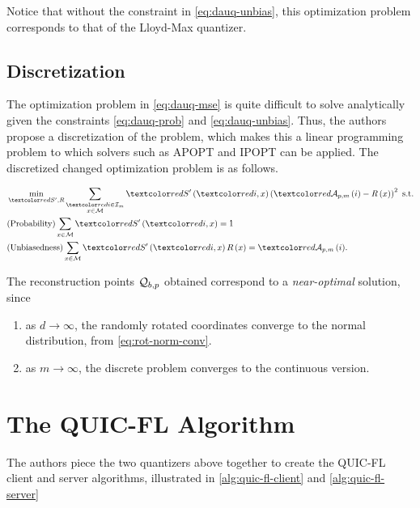 \documentclass[journal,12pt,twocolumn]{IEEEtran}
\begin{document}
Notice that without the constraint in \eqref{eq:dauq-unbias}, this optimization
problem corresponds to that of the Lloyd-Max quantizer. 

\subsection{Discretization}
\label{ssec:dauq-disc}
The optimization problem in \eqref{eq:dauq-mse} is quite difficult to solve
analytically given the constraints \eqref{eq:dauq-prob} and
\eqref{eq:dauq-unbias}. Thus, the authors propose a discretization of the
problem, which makes this a linear programming problem to which solvers such
as APOPT \cite{APOPT} and IPOPT \cite{IPOPT} can be applied. The discretized
changed optimization problem is as follows.

\begin{align}
    &\min_{\red{S^\prime},R} \sum_{\substack{\red{i\in\cI_m}\\x\in\cM}}\red{S^\prime}\brak{\red{i},x}\brak{\red{\cA_{p,m}\brak{i}}-R\brak{x}}^2 \text{ s.t.} \label{eq:dauq-disc-opt} \\
    &\text{(Probability)} \sum_{x\in\cM}\red{S^\prime}\brak{\red{i},x} = 1 \label{eq:dauq-disc-prob} \\
    &\text{(Unbiasedness)} \sum_{x\in\cM}\red{S^\prime}\brak{\red{i},x}R\brak{x} = \red{\cA_{p,m}\brak{i}}. \label{eq:dauq-disc-unbias}
\end{align}

The reconstruction points \(\mathcal Q_{b,p}\) obtained correspond to a
\emph{near-optimal} solution, since
\begin{enumerate}
    \item as \(d\to\infty\), the randomly rotated coordinates converge to
    the normal distribution, from \eqref{eq:rot-norm-conv}.
    \item as \(m\to\infty\), the discrete problem converges to the
    continuous version.
\end{enumerate}

\section{The QUIC-FL Algorithm}
\label{sec:quicfl}
The authors piece the two quantizers above together to create the QUIC-FL
client and server algorithms, illustrated in \autoref{alg:quic-fl-client} and \autoref{alg:quic-fl-server}
\end{document}
